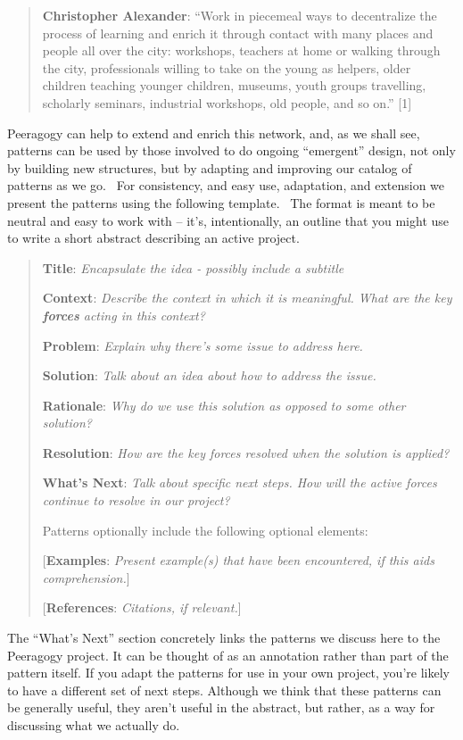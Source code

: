 \begin{quote}
\textbf{Christopher Alexander}: ``Work in piecemeal ways to decentralize
the process of learning and enrich it through contact with many places
and people all over the city: workshops, teachers at home or walking
through the city, professionals willing to take on the young as helpers,
older children teaching younger children, museums, youth groups
travelling, scholarly seminars, industrial workshops, old people, and so
on.'' {[}1{]}
\end{quote}

Peeragogy can help to extend and enrich this network, and, as we shall
see, patterns can be used by those involved to do ongoing ``emergent''
design, not only by building new structures, but by adapting and
improving our catalog of patterns as we go.~ For consistency, and easy
use, adaptation, and extension we present the patterns using the
following template.~ The format is meant to be neutral and easy to work
with -- it's, intentionally, an outline that you might use to write a
short abstract describing an active project.

\begin{quote}
\textbf{Title}: \emph{Encapsulate the idea - possibly include a
subtitle}

\textbf{Context}: \emph{Describe the context in which it is
  meaningful. What are the key \textbf{forces} acting in this
  context?}

\textbf{Problem}: \emph{Explain why there's some issue to address here.}

\textbf{Solution}: \emph{Talk about an idea about how to address the
  issue.}

\textbf{Rationale}: \emph{Why do we use this solution as opposed to
  some other solution?}

\textbf{Resolution}: \emph{How are the key forces resolved when the
  solution is applied?}

\textbf{What's Next}: \emph{Talk about specific next steps. How will
  the active forces continue to resolve in our project?}

Patterns optionally include the following optional elements:

{[}\textbf{Examples}: \emph{Present example(s) that have been
encountered, if this aids comprehension.}{]}

{[}\textbf{References}: \emph{Citations, if relevant.}{]}
\end{quote}

The ``What's Next'' section concretely links the patterns we discuss
here to the Peeragogy project.  It can be thought of as an annotation
rather than part of the pattern itself.  If you adapt the patterns for
use in your own project, you're likely to have a different set of next
steps.  Although we think that these patterns can be generally useful,
they aren't useful in the abstract, but rather, as a way for
discussing what we actually do.  

